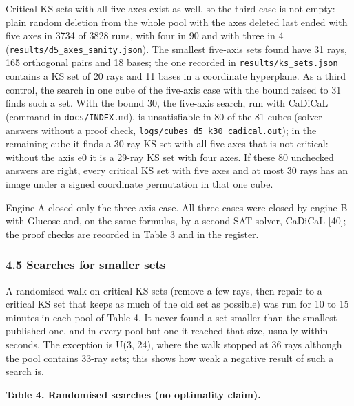 \documentclass[11pt,a4paper]{article}
\begin{document}
Critical KS sets with all five axes exist as well, so the third case is not empty: plain random
deletion from the whole pool with the axes deleted last ended with five axes in 3734 of 3828 runs,
with four in 90 and with three in 4 (\texttt{results/d5\_axes\_sanity.json}). The smallest five-axis sets
found have 31 rays, 165 orthogonal pairs and 18 bases; the one recorded in \texttt{results/ks\_sets.json}
contains a KS set of 20 rays and 11 bases in a coordinate hyperplane. As a third control, the search
in one cube of the five-axis case with the bound raised to 31 finds such a set. With the bound 30,
the five-axis search, run with CaDiCaL (command in \texttt{docs/INDEX.md}), is unsatisfiable in 80 of the 81
cubes (solver answers without a proof check, \texttt{logs/cubes\_d5\_k30\_cadical.out}); in the remaining cube
it finds a 30-ray KS set with all five axes that is not critical: without the axis e0 it is a 29-ray
KS set with four axes. If these 80 unchecked answers are right, every critical KS set with five axes
and at most 30 rays has an image under a signed coordinate permutation in that one cube.

Engine A closed only the three-axis case. All three cases were closed by engine B with Glucose and,
on the same formulas, by a second SAT solver, CaDiCaL {[}40{]}; the proof checks are recorded in Table 3
and in the register.

\subsubsection{4.5 Searches for smaller sets}\label{45-searches-for-smaller-sets}

A randomised walk on critical KS sets (remove a few rays, then repair to a critical KS set that keeps
as much of the old set as possible) was run for 10 to 15 minutes in each pool of Table 4. It never
found a set smaller than the smallest published one, and in every pool but one it reached that size,
usually within seconds. The exception is U(3, 24), where the walk stopped at 36 rays although the pool
contains 33-ray sets; this shows how weak a negative result of such a search is.

\textbf{Table 4. Randomised searches (no optimality claim).}
\end{document}
